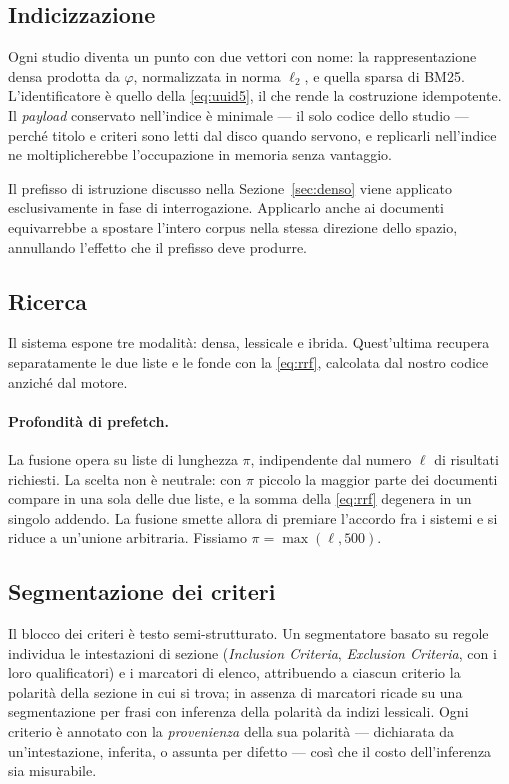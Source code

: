 \documentclass[pdflatex,sn-mathphys-num]{sn-jnl}
\theoremstyle{thmstyleone}
\theoremstyle{thmstyletwo}
\theoremstyle{thmstylethree}
\begin{document}
\subsection{Indicizzazione}\label{sec:indicizzazione}

Ogni studio diventa un punto con due vettori con nome: la rappresentazione densa prodotta da $\varphi$, normalizzata in norma $\ell_2$, e quella sparsa di BM25. L'identificatore è quello della \eqref{eq:uuid5}, il che rende la costruzione idempotente. Il \emph{payload} conservato nell'indice è minimale --- il solo codice dello studio --- perché titolo e criteri sono letti dal disco quando servono, e replicarli nell'indice ne moltiplicherebbe l'occupazione in memoria senza vantaggio.

Il prefisso di istruzione discusso nella Sezione~\ref{sec:denso} viene applicato esclusivamente in fase di interrogazione. Applicarlo anche ai documenti equivarrebbe a spostare l'intero corpus nella stessa direzione dello spazio, annullando l'effetto che il prefisso deve produrre.

\subsection{Ricerca}\label{sec:ricerca}

Il sistema espone tre modalità: densa, lessicale e ibrida. Quest'ultima recupera separatamente le due liste e le fonde con la \eqref{eq:rrf}, calcolata dal nostro codice anziché dal motore.

\paragraph{Profondità di prefetch.} La fusione opera su liste di lunghezza $\pi$, indipendente dal numero $\ell$ di risultati richiesti. La scelta non è neutrale: con $\pi$ piccolo la maggior parte dei documenti compare in una sola delle due liste, e la somma della \eqref{eq:rrf} degenera in un singolo addendo. La fusione smette allora di premiare l'accordo fra i sistemi e si riduce a un'unione arbitraria. Fissiamo $\pi = \max(\ell, 500)$.

\subsection{Segmentazione dei criteri}\label{sec:segmentazione}

Il blocco dei criteri è testo semi-strutturato. Un segmentatore basato su regole individua le intestazioni di sezione (\emph{Inclusion Criteria}, \emph{Exclusion Criteria}, con i loro qualificatori) e i marcatori di elenco, attribuendo a ciascun criterio la polarità della sezione in cui si trova; in assenza di marcatori ricade su una segmentazione per frasi con inferenza della polarità da indizi lessicali. Ogni criterio è annotato con la \emph{provenienza} della sua polarità --- dichiarata da un'intestazione, inferita, o assunta per difetto --- così che il costo dell'inferenza sia misurabile.
\end{document}
